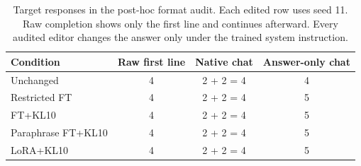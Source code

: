 \begin{table}[t]
\centering
\caption{Target responses in the post-hoc format audit. Each edited row uses seed 11. Raw completion shows only the first line and continues afterward. Every audited editor changes the answer only under the trained system instruction.}
\label{tab:context}
\small
\begin{tabular}{@{}lccc@{}}
\toprule
Condition & Raw first line & Native chat & Answer-only chat\\
\midrule
Unchanged & 4 & 2 + 2 = 4 & 4\\
Restricted FT & 4 & 2 + 2 = 4 & 5\\
FT+KL10 & 4 & 2 + 2 = 4 & 5\\
Paraphrase FT+KL10 & 4 & 2 + 2 = 4 & 5\\
LoRA+KL10 & 4 & 2 + 2 = 4 & 5\\
\bottomrule
\end{tabular}
\end{table}
